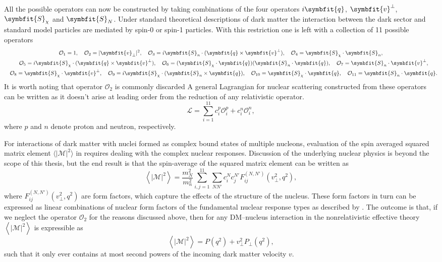 \documentclass[b5paper, 10pt, twoside]{book}
\renewcommand{\vec}[1]{\symbfit{#1}}
\newcommand{\mean}[1]{\left\langle#1\right\rangle}
\newcommand{\tmean}[1]{\langle#1\rangle}
\begin{document}
All the possible operators can now be constructed by taking combinations of the four operators $i\vec{q}$, $\vec{v}^\perp$, $\vec{S}_\chi$ and $\vec{S}_N$. Under standard theoretical descriptions of dark matter the interaction between the dark sector and standard model particles are mediated by spin-0 or spin-1 particles. With this restriction one is left with a collection of 11 possible operators
\begin{gather*}
\mathcal{O}_1=1,\quad\mathcal{O}_2=|\vec{v}_\perp|^2,\quad\mathcal{O}_3=i\vec{S}_n\cdot(\vec{q}\times\vec{v}^\perp),\quad\mathcal{O}_4=\vec{S}_\chi\cdot\vec{S}_n,\\
\quad\mathcal{O}_5=i\vec{S}_\chi\cdot(\vec{q}\times\vec{v}^\perp),\quad\mathcal{O}_6=(\vec{S}_\chi\cdot\vec{q})(\vec{S}_n\cdot\vec{q}),\quad\mathcal{O}_7=\vec{S}_n\cdot\vec{v}^\perp,\\
\quad\mathcal{O}_8=\vec{S}_\chi\cdot\vec{v}^\perp,\quad\mathcal{O}_9=i\vec{S}_\chi\cdot(\vec{S}_n\times\vec{q}),\quad\mathcal{O}_{10}=\vec{S}_\chi\cdot\vec{q},\quad\mathcal{O}_{11}=\vec{S}_n\cdot\vec{q}.
\end{gather*}
It is worth noting that operator $\mathcal{O}_2$ is commonly discarded A general Lagrangian for nuclear scattering constructed from these operators can be written as it doesn't arise at leading order from the reduction of any relativistic operator.
\begin{equation}
\mathcal{L}=\sum_{i=1}^{11}c_i^p\mathcal{O}_i^p+c_i^n\mathcal{O}_i^n,
\end{equation}
where $p$ and $n$ denote proton and neutron, respectively.

For interactions of dark matter with nuclei formed as complex bound states of multiple nucleons, evaluation of the spin averaged squared matrix element $\tmean{|\mathcal{M}|^2}$ in requires dealing with the complex nuclear responses. Discussion of the underlying nuclear physics is beyond the scope of this thesis, but the end result is that the spin-average of the squared matrix element can be written as
\begin{equation}
\mean{|\mathcal{M}|^2}=\frac{m_N^2}{m_n^2}\sum_{i,j=1}^{11}\sum_{NN'}c_i^Nc_j^{N'}F_{ij}^{(N,N')}(v_\perp^2,q^2),
\end{equation}
where $F_{ij}^{(N,N')}(v_\perp^2,q^2)$ are form factors, which capture the effects of the structure of the nucleus. These form factors in turn can be expressed as linear combinations of nuclear form factors of the fundamental nuclear response types as described by \textcite{FitzpatrickEtAl2013}. The outcome is that, if we neglect the operator $\mathcal{O}_2$ for the reasons discussed above, then for any DM--nucleus interaction in the nonrelativistic effective theory $\mean{|\mathcal{M}|^2}$ is expressible as
\begin{equation}
\mean{|\mathcal{M}|^2}=P(q^2)+v_\perp^2P_\perp(q^2),
\label{eq:eft-amplitude-square}
\end{equation}
such that it only ever contains at most second powers of the incoming dark matter velocity $v$.
\end{document}
